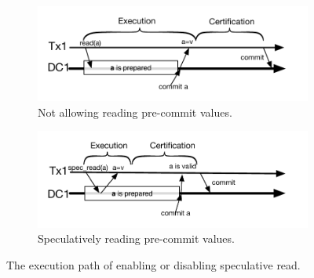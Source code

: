 \begin{figure}[t]
\centering
\begin{subfigure}[t!]{0.95\linewidth}
\def\svgwidth{0.95\columnwidth}
\centering \includegraphics[scale = 0.55]{figures/NoSpeculativeRead}
\vspace{-4mm}
\caption{\footnotesize Not allowing reading pre-commit values.}
\label{fig:remote:a}
\end{subfigure}

\begin{subfigure}[t!]{0.95\linewidth}
\vspace{1mm}
\def\svgwidth{0.95\columnwidth}
\centering \includegraphics[scale = 0.55]{figures/YesSpeculativeRead}%
\vspace{-4mm}
\caption{\footnotesize Speculatively reading pre-commit values.}
\label{fig:remote:b}
\end{subfigure}
\caption{\small The execution path of enabling or disabling speculative read.}
\label{fig:specularead}
\end{figure}

